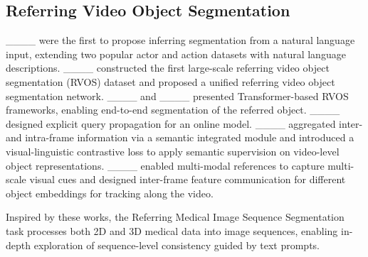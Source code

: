 
\subsection{Referring Video Object Segmentation}
____ were the first to propose inferring segmentation from a natural language input, extending two popular actor and action datasets with natural language descriptions.
____ constructed the first large-scale referring video object segmentation (RVOS) dataset and proposed a unified referring video object segmentation network.
____ and ____ presented Transformer-based RVOS frameworks, enabling end-to-end segmentation of the referred object.
____ designed explicit query propagation for an online model. 
____ aggregated inter- and intra-frame information via a semantic integrated module and introduced a visual-linguistic contrastive loss to apply semantic supervision on video-level object representations.
____ enabled multi-modal references to capture multi-scale visual cues and designed inter-frame feature communication for different object embeddings for tracking along the video.

Inspired by these works, the Referring Medical Image Sequence Segmentation task processes both 2D and 3D medical data into image sequences, enabling in-depth exploration of sequence-level consistency guided by text prompts.